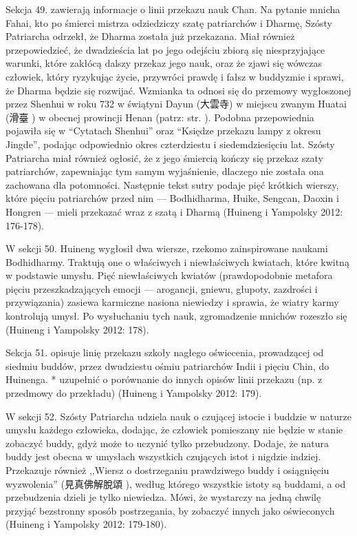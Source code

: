Sekcja 49. zawierają informacje o linii przekazu nauk Chan.
Na pytanie mnicha Fahai, kto po śmierci mistrza odziedziczy szatę patriarchów i Dharmę, Szósty Patriarcha odrzekł, że Dharma została już przekazana.
Miał również przepowiedzieć, że dwadzieścia lat po jego odejściu zbiorą się niesprzyjające warunki, które zakłócą dalszy przekaz jego nauk, oraz że zjawi się wówczas człowiek, który ryzykując życie, przywróci prawdę i fałsz w buddyzmie i sprawi, że Dharma będzie się rozwijać.
Wzmianka ta odnosi się do przemowy wygłoszonej przez Shenhui w roku 732 w świątyni Dayun (大雲寺) w miejscu zwanym Huatai (滑臺 ) w obecnej prowincji Henan (patrz: str. \pageref{Huatai}).
Podobna przepowiednia pojawiła się w ``Cytatach Shenhui'' oraz ``Księdze przekazu lampy z okresu Jingde'', podając odpowiednio okres czterdziestu i siedemdziesięciu lat.
Szósty Patriarcha miał również ogłosić, że z jego śmiercią kończy się przekaz szaty patriarchów, zapewniając tym samym wyjaśnienie, dlaczego nie została ona zachowana dla potomności.
Następnie tekst sutry podaje pięć krótkich wierszy, które pięciu patriarchów przed nim --- Bodhidharma, Huike, Sengcan, Daoxin i Hongren --- mieli przekazać wraz z szatą i Dharmą
(Huineng i Yampolsky 2012: 176-178).

W sekcji 50. Huineng wygłosił dwa wiersze, rzekomo zainspirowane naukami Bodhidharmy.
Traktują one o właściwych i niewłaściwych kwiatach, które kwitną w podstawie umysłu.
Pięć niewłaściwych kwiatów (prawdopodobnie metafora pięciu przeszkadzających emocji --- arogancji, gniewu, głupoty, zazdrości i przywiązania) zasiewa karmiczne nasiona niewiedzy i sprawia, że wiatry karmy kontrolują umysł.
Po wysłuchaniu tych nauk, zgromadzenie mnichów rozeszło się
(Huineng i Yampolsky 2012: 178).

Sekcja 51. opisuje linię przekazu szkoły nagłego oświecenia, prowadzącej od siedmiu buddów, przez dwudziestu ośmiu patriarchów Indii i pięciu Chin, do Huinenga.
* uzupełnić o porównanie do innych opisów linii przekazu (np. z przedmowy do przekładu)
(Huineng i Yampolsky 2012: 179).

W sekcji 52. Szósty Patriarcha udziela nauk o czującej istocie i buddzie w naturze umysłu każdego człowieka, dodając, że człowiek pomieszany nie będzie w stanie zobaczyć buddy, gdyż może to uczynić tylko przebudzony.
Dodaje, że natura buddy jest obecna w umysłach wszystkich czujących istot i nigdzie indziej.
Przekazuje również ,,Wiersz o dostrzeganiu prawdziwego buddy i osiągnięciu wyzwolenia'' (見真佛解脫頌 ), według którego wszystkie istoty są buddami, a od przebudzenia dzieli je tylko niewiedza.
Mówi, że wystarczy na jedną chwilę przyjąć bezstronny sposób postrzegania, by zobaczyć innych jako oświeconych
(Huineng i Yampolsky 2012: 179-180).

